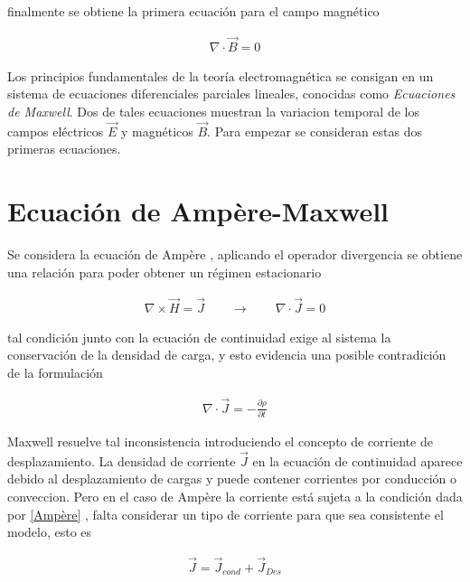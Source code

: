 \noindent finalmente se obtiene la primera ecuación para el campo magnético 

\begin{eqnarray}
    \label{divceroB}
    \boxed{\nabla \cdot \vec{B} = 0}
\end{eqnarray}

\noindent Los principios fundamentales de la teoría electromagnética se consigan en un sistema de ecuaciones diferenciales parciales lineales, conocidas como \emph{Ecuaciones de Maxwell}. Dos de tales ecuaciones muestran la variacion temporal de los campos eléctricos $\vec{E}$ y magnéticos $\vec{B}$. Para empezar se consideran estas dos primeras ecuaciones.\\



\section{Ecuación de Ampère-Maxwell}

\noindent Se considera la ecuación de Ampère \cite{Jackson} , aplicando el operador divergencia se obtiene una relación para poder obtener un régimen estacionario



\begin{eqnarray}
    \label{Ampère}
    \nabla \times \vec{H} = \vec{J} \qquad  \longrightarrow  \qquad 
    \nabla \cdot \vec{J} = 0 
\end{eqnarray}

\noindent tal condición junto con la ecuación de continuidad exige al sistema la conservación de la densidad de carga, y esto evidencia una posible contradición de la formulación

\begin{eqnarray}
    \nabla \cdot \vec{J} = -\frac{\partial \rho}{\partial t}
\end{eqnarray}

\noindent Maxwell resuelve tal inconsistencia introduciendo el concepto de corriente de desplazamiento. La densidad de corriente $\vec{J}$ en la ecuación de continuidad aparece debido al desplazamiento de cargas y puede contener corrientes por conducción o conveccion. Pero en el caso de Ampère la corriente está sujeta a la condición dada por  \eqref{Ampère} , falta considerar un tipo de corriente para que sea consistente el modelo, esto es

\begin{eqnarray}
    \vec{J} = \vec{J}_{cond} + \vec{J}_{Des}
\end{eqnarray}

